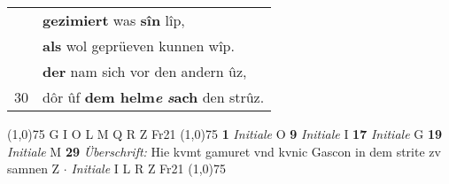 \documentclass[8pt,a4paper,notitlepage]{article}
\begin{document}
\begin{table}[ht]
\begin{minipage}[t]{0.5\linewidth}
\begin{tabular}{rl}
 & \textbf{gezimiert} was \textbf{sîn} lîp,\\ 
 & \textbf{als} wol geprüeven kunnen wîp.\\ 
 & \textbf{der} nam sich vor den andern ûz,\\ 
30 & dôr ûf \textbf{dem helm\textit{e}} \textbf{\textit{s}ach} den strûz.\\ 
\end{tabular}
\scriptsize
\line(1,0){75} \newline
G I O L M Q R Z Fr21 \newline
\line(1,0){75} \newline
\textbf{1} \textit{Initiale} O  \textbf{9} \textit{Initiale} I  \textbf{17} \textit{Initiale} G  \textbf{19} \textit{Initiale} M  \textbf{29} \textit{Überschrift:} Hie kvmt gamuret vnd kvnic Gascon in dem strite zv samnen Z   $\cdot$ \textit{Initiale} I L R Z Fr21  \newline
\line(1,0){75} \newline

\end{minipage}
\end{table}
\end{document}
